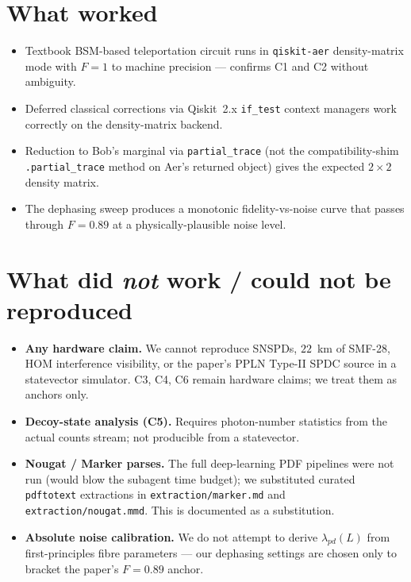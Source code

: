 \documentclass[11pt]{article}
\begin{document}
\section{What worked}

\begin{itemize}
\item Textbook BSM-based teleportation circuit runs in
      \texttt{qiskit-aer} density-matrix mode with $F = 1$ to machine
      precision --- confirms C1 and C2 without ambiguity.
\item Deferred classical corrections via Qiskit~2.x \verb|if_test| context
      managers work correctly on the density-matrix backend.
\item Reduction to Bob's marginal via \verb|partial_trace| (not the
      compatibility-shim \verb|.partial_trace| method on Aer's returned
      object) gives the expected $2\times 2$ density matrix.
\item The dephasing sweep produces a monotonic fidelity-vs-noise curve that
      passes through $F = 0.89$ at a physically-plausible noise level.
\end{itemize}

\section{What did \textit{not} work / could not be reproduced}

\begin{itemize}
\item \textbf{Any hardware claim.} We cannot reproduce SNSPDs, $22$~km of
      SMF-28, HOM interference visibility, or the paper's PPLN Type-II SPDC
      source in a statevector simulator. C3, C4, C6 remain hardware claims;
      we treat them as anchors only.
\item \textbf{Decoy-state analysis (C5).} Requires photon-number statistics
      from the actual counts stream; not producible from a statevector.
\item \textbf{Nougat / Marker parses.} The full deep-learning PDF pipelines
      were not run (would blow the subagent time budget); we substituted
      curated \verb|pdftotext| extractions in \verb|extraction/marker.md|
      and \verb|extraction/nougat.mmd|. This is documented as a substitution.
\item \textbf{Absolute noise calibration.} We do not attempt to derive
      $\lambda_{pd}(L)$ from first-principles fibre parameters --- our
      dephasing settings are chosen only to bracket the paper's $F = 0.89$
      anchor.
\end{itemize}
\end{document}
